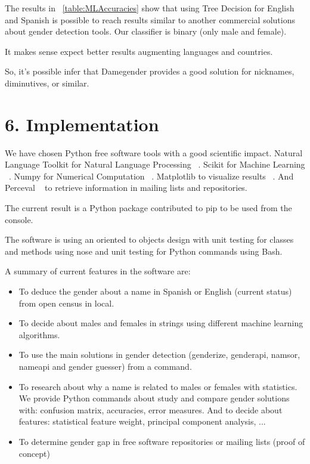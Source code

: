 \documentclass[fleqn,10pt,lineno]{wlpeerj} %
\begin{document}
The results in ~\ref{table:MLAccuracies} show that using Tree
Decision for English and Spanish is possible to reach results similar
to another commercial solutions about gender detection tools. Our
classifier is binary (only male and female).

It makes sense expect better results augmenting languages and
countries.

So, it's possible infer that Damegender provides a good solution for
nicknames, diminutives, or similar.

\section*{6. Implementation}

We have chosen Python free software tools with a good scientific
impact. Natural Language Toolkit for Natural Language Processing
~\cite{loper2002nltk}. Scikit for Machine Learning
~\cite{pedregosa2011scikit}. Numpy for Numerical Computation
~\cite{van2011numpy}. Matplotlib to visualize results
~\cite{hunter2007matplotlib}. And Perceval ~\cite{duenas2018perceval}
to retrieve information in mailing lists and repositories.

The current result is a Python package contributed to pip to be used
from the console.

The software is using an oriented to objects design with unit testing
for classes and methods using nose and unit testing for Python
commands using Bash.

A summary of current features in the software are:

\begin{itemize}[noitemsep]
\item To deduce the gender about a name in Spanish or English (current
  status) from open census in local.
\item To decide about males and females in strings using different
  machine learning algorithms.
\item To use the main solutions in gender detection (genderize, genderapi,
namsor, nameapi and gender guesser) from a command.
\item To research about why a name is related to males or females with
  statistics. We provide Python commands about study and compare
  gender solutions with: confusion matrix, accuracies, error
  measures. And to decide about features: statistical feature weight,
  principal component analysis, ...
\item To determine gender gap in free software repositories or mailing
  lists (proof of concept)
\end{itemize}
\end{document}
